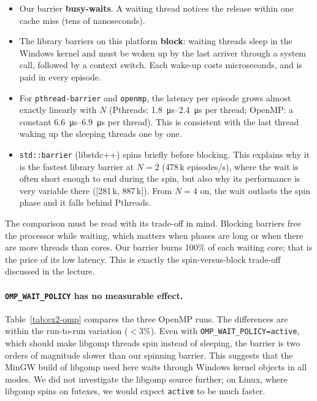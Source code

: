 \begin{itemize}
    \item Our barrier \textbf{busy-waits}. A waiting thread notices the
          release within one cache miss (tens of nanoseconds).
    \item The library barriers on this platform \textbf{block}: waiting
          threads sleep in the Windows kernel and must be woken up by the
          last arriver through a system call, followed by a context switch.
          Each wake-up costs microseconds, and is paid in every episode.
    \item For \texttt{pthread-barrier} and \texttt{openmp}, the latency per
          episode grows almost exactly linearly with $N$ (Pthreads:
          \SIrange{1.8}{2.4}{\micro\second} per thread; OpenMP: a constant
          \SIrange{6.6}{6.9}{\micro\second} per thread). This is
          consistent with the last thread waking up the sleeping threads
          one by one.
    \item \texttt{std::barrier} (libstdc++) spins briefly before blocking.
          This explains why it is the fastest library barrier at $N=2$
          (\num{478}\,k episodes/s), where the wait is often short enough to
          end during the spin, but also why its performance is very
          variable there ([\num{281}\,k, \num{887}\,k]). From $N=4$ on, the
          wait outlasts the spin phase and it falls behind Pthreads.
\end{itemize}

The comparison must be read with its trade-off in mind. Blocking barriers
free the processor while waiting, which matters when phases are long or
when there are more threads than cores. Our barrier burns 100\% of each
waiting core; that is the price of its low latency. This is exactly the
spin-versus-block trade-off discussed in the lecture.

\paragraph{\texttt{OMP\_WAIT\_POLICY} has no measurable effect.}
Table~\ref{tab:ex2-omp} compares the three OpenMP runs. The differences
are within the run-to-run variation ($<3\%$). Even with
\texttt{OMP\_WAIT\_POLICY=active}, which should make libgomp threads spin
instead of sleeping, the barrier is two orders of magnitude slower than our
spinning barrier. This suggests that the MinGW build of libgomp used here
waits through Windows kernel objects in all modes. We did not investigate
the libgomp source further; on Linux, where libgomp spins on futexes, we
would expect \texttt{active} to be much faster.

